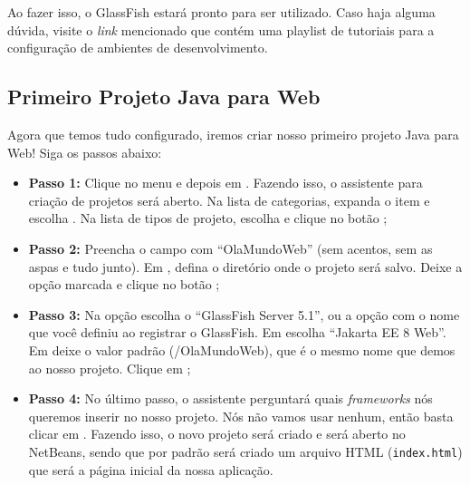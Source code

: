 Ao fazer isso, o GlassFish estará pronto para ser utilizado. Caso haja alguma dúvida, visite o \textit{link} mencionado que contém uma playlist de tutoriais para a configuração de ambientes de desenvolvimento.


\subsection{Primeiro Projeto Java para Web}\label{subsec:primeiroProjeto}

Agora que temos tudo configurado, iremos criar nosso primeiro projeto Java para Web! Siga os passos abaixo:

\begin{itemize}

    \item \textbf{Passo 1:} Clique no menu  e depois em  . Fazendo isso, o assistente para criação de projetos será aberto. Na lista de categorias, expanda o item   e escolha  . Na lista de tipos de projeto, escolha   e clique no botão  ;
    
    \item \textbf{Passo 2:} Preencha o campo  com ``OlaMundoWeb'' (sem acentos, sem as aspas e tudo junto). Em , defina o diretório onde o projeto será salvo. Deixe a opção  marcada e clique no botão ;
    
    \item \textbf{Passo 3:} Na opção  escolha o ``GlassFish Server 5.1'', ou a opção com o nome que você definiu ao registrar o GlassFish. Em  escolha ``Jakarta EE 8 Web''. Em  deixe o valor padrão (/OlaMundoWeb), que é o mesmo nome que demos ao nosso projeto. Clique em ;
    
    \item \textbf{Passo 4:} No último passo, o assistente perguntará quais \textit{frameworks} nós queremos inserir no nosso projeto. Nós não vamos usar nenhum, então basta clicar em . Fazendo isso, o novo projeto será criado e será aberto no NetBeans, sendo que por padrão será criado um arquivo HTML (\texttt{index.html}) que será a página inicial da nossa aplicação.
    
\end{itemize}

